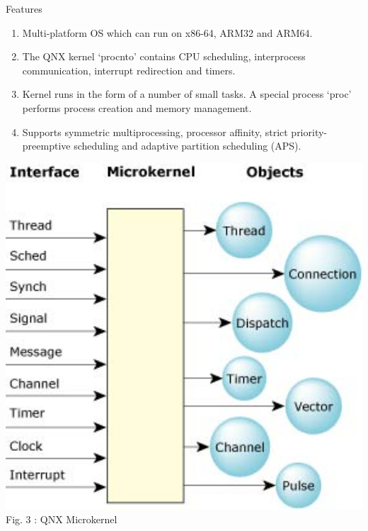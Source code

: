 \documentclass[final]{beamer}
\newlength{\onecolwid}
\newlength{\twocolwid}
\begin{document}
\begin{frame}[t]
\begin{columns}[t]
\begin{column}{\twocolwid}
\begin{columns}[t,totalwidth=\twocolwid]
\begin{column}{\onecolwid}\vspace{-.6in} %


\begin{block}{Features}
\begin{enumerate}
\item Multi-platform OS which can run on x86-64, ARM32 and ARM64.
\item The QNX kernel ‘procnto’ contains CPU scheduling, interprocess communication, interrupt redirection and timers.
\item Kernel runs in the form of a number of small tasks. A special process ‘proc’ performs process creation and memory management.
\item Supports symmetric multiprocessing, processor affinity, strict priority-preemptive scheduling and adaptive partition scheduling (APS).
\end{enumerate}
\vspace{10mm}
\vfill
\begin{center}
 \includegraphics[width=18cm]{qnx_kernel.jpg}\\
  \caption{Fig. 3 : QNX Microkernel}
\end{center}


\end{block}
\end{column}
\end{columns}
\end{column}
\end{columns}
\end{frame}
\end{document}
